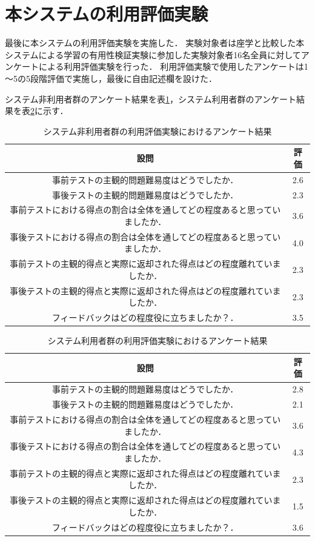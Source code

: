 \newpage

\section{本システムの利用評価実験}
最後に本システムの利用評価実験を実施した．
実験対象者は座学と比較した本システムによる学習の有用性検証実験に参加した実験対象者16名全員に対してアンケートによる利用評価実験を行った．
利用評価実験で使用したアンケートは1～5の5段階評価で実施し，最後に自由記述欄を設けた．

システム非利用者群のアンケート結果を表\ref{tab:unsystem_anke}，システム利用者群のアンケート結果を表\ref{tab:system_anke}に示す．

\begin{table}[tb]
    \centering
    \caption{システム非利用者群の利用評価実験におけるアンケート結果}
    \label{tab:unsystem_anke}
    \begin{tabular}{|c|c|}
    \hline
     設問 & 評価 \\ \hline \hline
     事前テストの主観的問題難易度はどうでしたか． & 2.6 \\ \hline
     事後テストの主観的問題難易度はどうでしたか． & 2.3 \\ \hline
     事前テストにおける得点の割合は全体を通してどの程度あると思っていましたか． & 3.6 \\ \hline
     事後テストにおける得点の割合は全体を通してどの程度あると思っていましたか． & 4.0 \\ \hline
     事前テストの主観的得点と実際に返却された得点はどの程度離れていましたか． & 2.3 \\ \hline
     事後テストの主観的得点と実際に返却された得点はどの程度離れていましたか． & 2.3 \\ \hline
     フィードバックはどの程度役に立ちましたか？． & 3.5 \\ \hline
    \end{tabular}
\end{table}

\begin{table}[tb]
    \centering
    \caption{システム利用者群の利用評価実験におけるアンケート結果}
    \label{tab:system_anke}
    \begin{tabular}{|c|c|}
    \hline
     設問 & 評価 \\ \hline \hline
     事前テストの主観的問題難易度はどうでしたか． & 2.8 \\ \hline
     事後テストの主観的問題難易度はどうでしたか． & 2.1 \\ \hline
     事前テストにおける得点の割合は全体を通してどの程度あると思っていましたか． & 3.6 \\ \hline
     事後テストにおける得点の割合は全体を通してどの程度あると思っていましたか． & 4.3 \\ \hline
     事前テストの主観的得点と実際に返却された得点はどの程度離れていましたか． & 2.3 \\ \hline
     事後テストの主観的得点と実際に返却された得点はどの程度離れていましたか． & 1.5 \\ \hline
     フィードバックはどの程度役に立ちましたか？． & 3.6 \\ \hline
    \end{tabular}
\end{table}

